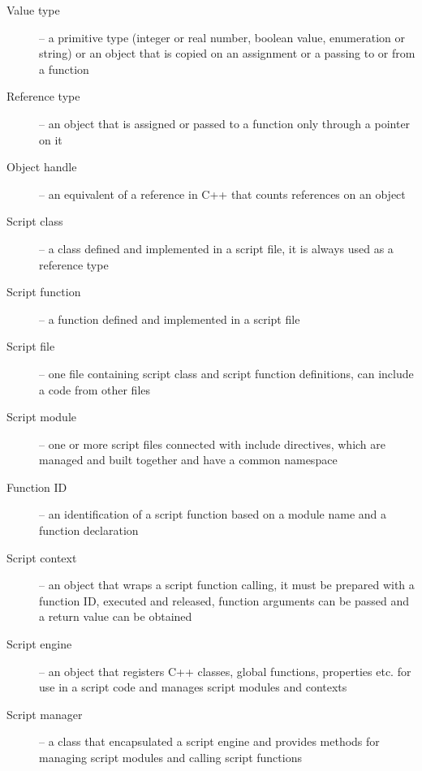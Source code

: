 \begin{description}
  \item[Value type] -- a primitive type (integer or real number, boolean value, enumeration or string) or an object that is copied on an assignment or a passing to or from a function
  \item[Reference type] -- an object that is assigned or passed to a function only through a pointer on it
  \item[Object handle] -- an equivalent of a reference in C++ that counts references on an object
	\item[Script class] -- a class defined and implemented in a script file, it is always used as a reference type
	\item[Script function] -- a function defined and implemented in a script file
	\item[Script file] -- one file containing script class and script function definitions, can include a code from other files
	\item[Script module] -- one or more script files connected with include directives, which are managed and built together and have a common namespace
	\item[Function ID] -- an identification of a script function based on a module name and a function declaration
	\item[Script context] -- an object that wraps a script function calling, it must be prepared with a function ID, executed and released, function arguments can be passed and a return value can be obtained
	\item[Script engine] -- an object that registers C++ classes, global functions, properties etc. for use in a script code and manages script modules and contexts
	\item[Script manager] -- a class that encapsulated a script engine and provides methods for managing script modules and calling script functions
\end{description}